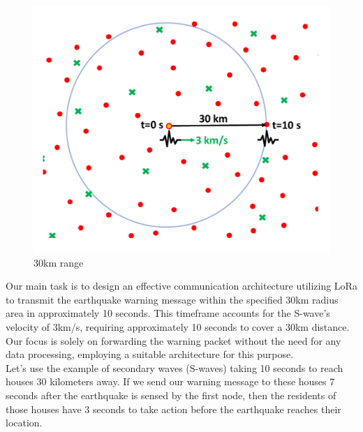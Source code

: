 \begin{figure}[htp!]
    \centering
    \includegraphics[scale=0.3]{images/30km.png}
    \caption{30km range}
\end{figure}

Our main task is to design an effective communication architecture utilizing LoRa to transmit the earthquake warning message within the specified 30km radius area in approximately 10 seconds. This timeframe accounts for the S-wave's velocity of 3km/s, requiring approximately 10 seconds to cover a 30km distance. Our focus is solely on forwarding the warning packet without the need for any data processing, employing a suitable architecture for this purpose.\\

Let's use the example of secondary waves (S-waves) taking 10 seconds to reach houses 30 kilometers away. If we send our warning message to these houses 7 seconds after the earthquake is sensed by the first node, then the residents of those houses have 3 seconds to take action before the earthquake reaches their location.